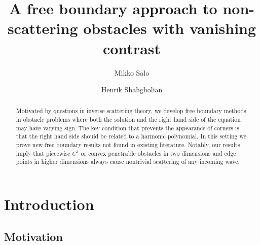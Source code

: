 \documentclass[11pt,a4paper]{amsart}
\theoremstyle{definition}
\numberwithin{equation}{section}
\begin{document}
\title{A free boundary approach to non-scattering obstacles with vanishing contrast}



\author{Mikko Salo}
\address{Department of Mathematics and Statistics, P.O. Box 35 (MaD), FI-40014 University of Jyv\"{a}skyl\"{a}, Finland.}

\author{Henrik Shahgholian}
\address{Department of Mathematics, KTH Royal Institute of Technology, SE-100 44 Stockholm, Sweden.}











\begin{abstract}
Motivated by questions in inverse scattering theory, we develop free boundary methods in obstacle problems where both the solution and the right hand side of the equation may have varying sign. The key condition that prevents the appearance of corners is that the right hand side should be related to a harmonic polynomial. In this setting we prove new free boundary results not found in existing literature. Notably, our results imply that piecewise $C^1$ or convex penetrable obstacles in two dimensions and edge points in higher dimensions always cause nontrivial scattering of any incoming wave.
\end{abstract}




\maketitle




\section{Introduction} \label{sec_introduction}

\subsection{Motivation}
\end{document}
